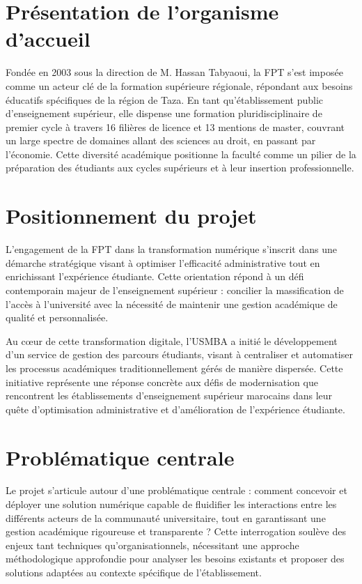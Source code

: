 \documentclass[12pt,a4paper]{report}
\begin{document}
\section*{Présentation de l'organisme d'accueil}
Fondée en 2003 sous la direction de M. Hassan Tabyaoui, la FPT s'est imposée comme un acteur clé de la formation supérieure régionale, répondant aux besoins éducatifs spécifiques de la région de Taza. En tant qu'établissement public d'enseignement supérieur, elle dispense une formation pluridisciplinaire de premier cycle à travers 16 filières de licence et 13 mentions de master, couvrant un large spectre de domaines allant des sciences au droit, en passant par l'économie. Cette diversité académique positionne la faculté comme un pilier de la préparation des étudiants aux cycles supérieurs et à leur insertion professionnelle.

\section*{Positionnement du projet}
L'engagement de la FPT dans la transformation numérique s'inscrit dans une démarche stratégique visant à optimiser l'efficacité administrative tout en enrichissant l'expérience étudiante. Cette orientation répond à un défi contemporain majeur de l'enseignement supérieur : concilier la massification de l'accès à l'université avec la nécessité de maintenir une gestion académique de qualité et personnalisée.

Au cœur de cette transformation digitale, l'USMBA a initié le développement d'un service de gestion des parcours étudiants, visant à centraliser et automatiser les processus académiques traditionnellement gérés de manière dispersée. Cette initiative représente une réponse concrète aux défis de modernisation que rencontrent les établissements d'enseignement supérieur marocains dans leur quête d'optimisation administrative et d'amélioration de l'expérience étudiante.

\section*{Problématique centrale}
Le projet s'articule autour d'une problématique centrale : comment concevoir et déployer une solution numérique capable de fluidifier les interactions entre les différents acteurs de la communauté universitaire, tout en garantissant une gestion académique rigoureuse et transparente ? Cette interrogation soulève des enjeux tant techniques qu'organisationnels, nécessitant une approche méthodologique approfondie pour analyser les besoins existants et proposer des solutions adaptées au contexte spécifique de l'établissement.
\end{document}
